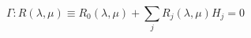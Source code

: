 \begin{equation}
\Gamma: R(\lambda, \mu) \equiv R_0(\lambda,\mu) + \sum_j R_j(\lambda,\mu) H_j = 0
\label{specurve}
\end{equation}

